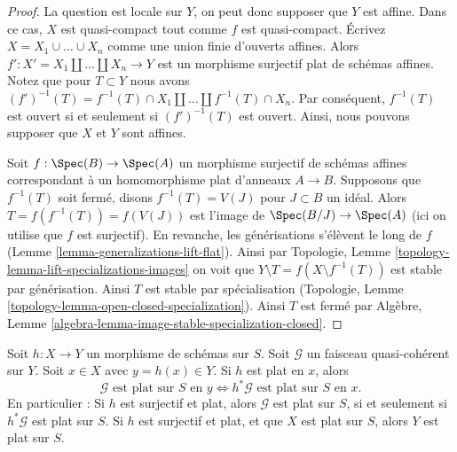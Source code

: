 \begin{proof}
La question est locale sur $Y$, on peut donc supposer que $Y$
est affine. Dans ce cas, $X$ est quasi-compact
tout comme $f$ est quasi-compact. Écrivez $X = X_1 \cup \ldots \cup X_n$ comme
une union finie d'ouverts affines. Alors $f' : X' = X_1 \amalg \ldots \amalg X_n \to Y$ est un
morphisme surjectif plat de schémas affines. Notez que pour $T \subset Y$
nous avons $(f')^{-1}(T) = f^{-1}(T) \cap X_1 \amalg \ldots \amalg f^{-1}(T) \cap X_n$. Par conséquent, $f^{-1}(T)$ est ouvert si et seulement
si $(f')^{-1}(T)$ est ouvert. Ainsi, nous pouvons supposer
que $X$ et $Y$ sont affines.

\medskip\noindent
Soit $f : \Spec(B) \to \Spec(A)$ un morphisme surjectif de schémas affines
correspondant à un homomorphisme plat d'anneaux $A \to B$.
Supposons que $f^{-1}(T)$ soit fermé, disons $f^{-1}(T) = V(J)$
pour $J \subset B$ un idéal. Alors $T = f(f^{-1}(T)) = f(V(J))$ est l'image
de $\Spec(B/J) \to \Spec(A)$ (ici on utilise que $f$ est surjectif).
En revanche, les générisations s'élèvent le long
de $f$ (Lemme \ref{lemma-generalizations-lift-flat}). Ainsi par Topologie, Lemme
\ref{topology-lemma-lift-specializations-images} on voit que $Y \setminus T = f(X \setminus f^{-1}(T))$ est stable par générisation.
Ainsi $T$ est stable par spécialisation
(Topologie, Lemme \ref{topology-lemma-open-closed-specialization}). Ainsi $T$
est fermé par
Algèbre, Lemme \ref{algebra-lemma-image-stable-specialization-closed}.
\end{proof}

\begin{lemma}
\label{lemma-flat-permanence}
Soit $h : X \to Y$ un morphisme de schémas sur $S$. Soit
$\mathcal{G}$ un faisceau quasi-cohérent sur $Y$. Soit
$x \in X$ avec $y = h(x) \in Y$. Si $h$ est plat en $x$, alors
$$
\mathcal{G}\text{ est plat sur }S\text{ en }y
\Leftrightarrow
h^*\mathcal{G}\text{ est plat sur }S\text{ en }x.
$$
En particulier : Si $h$ est surjectif et plat, alors $\mathcal{G}$
est plat sur $S$, si et seulement si $h^*\mathcal{G}$
est plat sur $S$. Si $h$ est surjectif et plat, et que $X$
est plat sur $S$, alors $Y$ est plat sur $S$.
\end{lemma}

